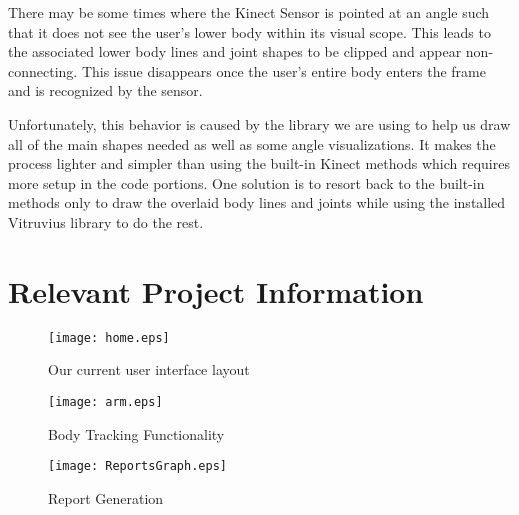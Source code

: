 \documentclass[onecolumn, draftclsnofoot,10pt, compsoc]{IEEEtran}
\begin{document}
There may be some times where the Kinect Sensor is pointed at an angle such that it does not see the user's lower body within its visual scope. This leads to the associated lower body lines and joint shapes to be clipped and appear non-connecting. This issue disappears once the user's entire body enters the frame and is recognized by the sensor. 

Unfortunately, this behavior is caused by the library we are using to help us draw all of the main shapes needed as well as some angle visualizations. It makes the process lighter and simpler than using the built-in Kinect methods which requires more setup in the code portions. One solution is to resort back to the built-in methods only to draw the overlaid body lines and joints while using the installed Vitruvius library to do the rest\cite{Vitruvius}.
\section{Relevant Project Information}
\begin{figure}[H]
  \texttt{[image: home.eps]}
  \caption{Our current user interface layout}
    \label{fig:UI}
\end{figure}

\begin{figure}[H]
  \texttt{[image: arm.eps]}
  \caption{Body Tracking Functionality}
    \label{fig:BodyTrack}
\end{figure}

\begin{figure}[H]
  \texttt{[image: ReportsGraph.eps]}
  \caption{Report Generation}
    \label{fig:ReportGeneration}
\end{figure}
\end{document}
